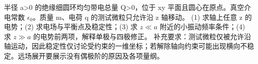 半径 a>0 的绝缘细圆环均匀带电总量 Q>0，位于 xy 平面且圆心在原点。真空介电常数 \(\epsilon_0\)。质量 m、电荷 q 的测试微粒只允许沿 z 轴移动。
(1) 求轴上任意 z 的电势；(2) 求电场与平衡点及稳定性；(3) 求 \(z\ll a\) 附近的小振动频率条件；(4) 求 \(z\gg a\) 的电势前两项，解释单极与四极修正。
补充要求：测试微粒仅被允许沿轴运动，因此稳定性仅讨论受约束的一维坐标；若解除轴向约束可能出现横向不稳定。远场展开要展示没有偶极阶的原因及各项量纲。
